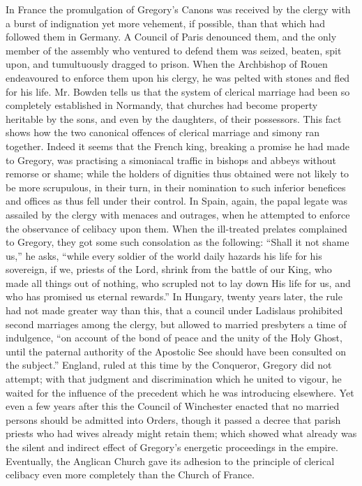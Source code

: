 In France the promulgation of Gregory's Canons
was received by the clergy with a burst of indignation yet more
vehement, if possible, than that which had followed them in Germany. A
Council of Paris denounced them, and the only member of the assembly
who ventured to defend them was seized, beaten, spit upon, and
tumultuously dragged to prison. When the Archbishop of Rouen
endeavoured to enforce them upon his clergy, he was pelted with stones
and fled for his life. Mr. Bowden tells us that the system of clerical
marriage had been so completely established in Normandy, that churches
had become property heritable by the sons, and even by the daughters,
of their possessors. This fact shows how the two canonical offences of
clerical marriage and simony ran together. Indeed it seems that the
French king, breaking a promise he had made to Gregory, was practising
a simoniacal traffic in bishops and abbeys without remorse or shame;
while the holders of dignities thus obtained were not likely to
be more scrupulous, in their turn, in their nomination to such
inferior benefices and offices as thus fell under their control. In
Spain, again, the papal legate was assailed by the clergy with menaces
and outrages, when he attempted to enforce the observance of celibacy
upon them. When the ill-treated prelates complained to Gregory, they
got some such consolation as the following: ``Shall it not shame us,''
he asks, ``while every soldier of the world daily hazards his life for
his sovereign, if we, priests of the Lord, shrink from the battle of
our King, who made all things out of nothing, who scrupled not to lay
down His life for us, and who has promised us eternal rewards.'' In
Hungary, twenty years later, the rule had not made greater way than
this, that a council under Ladislaus prohibited second marriages among
the clergy, but allowed to married presbyters a time of indulgence, ``on
account of the bond of peace and the unity of the Holy Ghost, until
the paternal authority of the Apostolic See should have been consulted
on the subject.'' England, ruled at this time by the Conqueror, Gregory
did not attempt; with that judgment and discrimination which he united
to vigour, he waited for the influence of the precedent which he was
introducing elsewhere. Yet even a few years after this the Council of
Winchester enacted that no married persons should be admitted into
Orders, though it passed a decree that parish priests who had wives
already might retain them; which showed what already was the silent
and indirect effect of Gregory's energetic proceedings in the empire.
Eventually, the Anglican Church gave its adhesion to the principle of
clerical celibacy even more completely than the Church of France.

